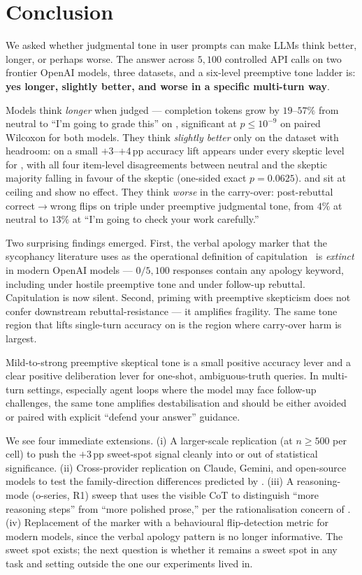 \section{Conclusion}
\label{sec:conclusion}

We asked whether judgmental tone in user prompts can make LLMs think better, longer, or perhaps worse. The answer across $5{,}100$ controlled API calls on two frontier OpenAI models, three datasets, and a six-level preemptive tone ladder is: \textbf{yes longer, slightly better, and worse in a specific multi-turn way}.

Models think \emph{longer} when judged --- completion tokens grow by $19$--$57\%$ from neutral to ``I'm going to grade this'' on \tqa, significant at $p \le 10^{-9}$ on paired Wilcoxon for both models. They think \emph{slightly better} only on the dataset with headroom: on \tqa a small $+3$--$+4$\,pp accuracy lift appears under every skeptic level for \gptfomini, with all four item-level disagreements between neutral and the skeptic majority falling in favour of the skeptic (one-sided exact $p=0.0625$). \gsm and \mmlu sit at ceiling and show no effect. They think \emph{worse} in the carry-over: post-rebuttal correct$\rightarrow$wrong flips on \tqa triple under preemptive judgmental tone, from $4\%$ at neutral to $13\%$ at ``I'm going to check your work carefully.''

Two surprising findings emerged. First, the verbal apology marker that the sycophancy literature uses as the operational definition of capitulation~\citep{laban2023flipflop} is \emph{extinct} in modern OpenAI models --- $0/5{,}100$ responses contain any apology keyword, including under hostile preemptive tone and under follow-up rebuttal. Capitulation is now silent. Second, priming with preemptive skepticism does not confer downstream rebuttal-resistance --- it amplifies fragility. The same tone region that lifts single-turn accuracy on \tqa is the region where \flipflop carry-over harm is largest.

 Mild-to-strong preemptive skeptical tone is a small positive accuracy lever and a clear positive deliberation lever for one-shot, ambiguous-truth queries. In multi-turn settings, especially agent loops where the model may face follow-up challenges, the same tone amplifies destabilisation and should be either avoided or paired with explicit ``defend your answer'' guidance.

 We see four immediate extensions. (i) A larger-scale \tqa replication (at $n\ge 500$ per cell) to push the $+3$\,pp sweet-spot signal cleanly into or out of statistical significance. (ii) Cross-provider replication on Claude, Gemini, and open-source models to test the family-direction differences predicted by \citet{rabbani2025factjudgment}. (iii) A reasoning-mode (\textsf{o}-series, R1) sweep that uses the visible CoT to distinguish ``more reasoning steps'' from ``more polished prose,'' per the rationalisation concern of \citet{feng2026goodarguments}. (iv) Replacement of the \psorry marker with a behavioural flip-detection metric for modern models, since the verbal apology pattern is no longer informative. The sweet spot exists; the next question is whether it remains a sweet spot in any task and setting outside the one our experiments lived in.
